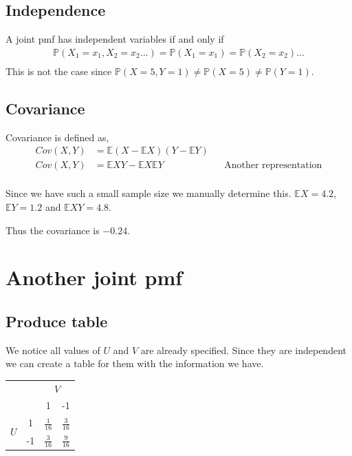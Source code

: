 \documentclass{article}
\newcommand{\prob}{\mathbb{P}}
\newcommand{\expect}{\mathbb{E}}
\begin{document}
\subsection{Independence}
A joint pmf has independent variables if and only if
\begin{align*}
    \prob(X_1=x_1, X_2=x_2...) = \prob(X_1=x_1) = \prob(X_2=x_2)... \\
\end{align*}
This is not the case since $\prob(X = 5, Y = 1) \neq \prob(X=5)
\neq \prob(Y=1)$.

\subsection{Covariance}
Covariance is defined as,
\begin{align*}
    Cov(X,Y) &= \expect(X - \expect X)(Y - \expect Y) \\
    Cov(X,Y) &= \expect XY - \expect X \expect Y
    && \text{Another representation} \\
\end{align*}

Since we have such a small sample size we manually determine this.
$\expect X = 4.2$, $\expect Y = 1.2$ and $\expect XY = 4.8$.

Thus the covariance is $-0.24$.

\section{Another joint pmf}
\subsection{Produce table}
We notice all values of $U$ and $V$ are already specified. Since they are
independent we can create a table for them with the information we have.
\begin{center}
\begin{tabular}{ c c|c c  }
    & & \multicolumn{2}{c}{$V$} \\
    & & 1 & -1\\
    \hline
    \multirow{2}{*}{$U$} & 1 & $\frac{1}{16}$ & $\frac{3}{16}$ \\
    & -1 & $\frac{3}{16}$ & $\frac{9}{16}$ \\
\end{tabular}
\end{center}
\end{document}
